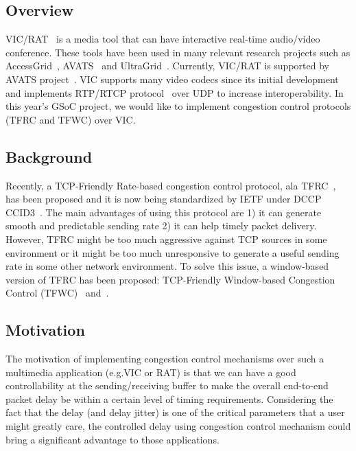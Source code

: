 
\subsection{\label{ssec:project_overview}Overview}

VIC/RAT~\cite{MEDIATOOLS} is a media tool that can have interactive real-time
audio/video conference. These tools have been used in many relevant research
projects such as AccessGrid~\cite{ACCESSGRID}, AVATS~\cite{AVATS} and
UltraGrid~\cite{UltraGrid}. Currently, VIC/RAT is supported by AVATS
project~\cite{AVATS}. VIC supports many video codecs since its initial
development and implements RTP/RTCP protocol~\cite{RTP} over UDP to increase
interoperability. In this year's GSoC project, we would like to implement
congestion control protocols (TFRC and TFWC) over VIC. 

\subsection{\label{ssec:background}Background}

Recently, a TCP-Friendly Rate-based congestion control protocol, ala
TFRC~\cite{FHPW00}, has been proposed and it is now being standardized by IETF
under DCCP CCID3~\cite{CCID3}. The main advantages of using this protocol are 1)
it can generate smooth and predictable sending rate 2) it can help timely packet
delivery. However, TFRC might be too much aggressive against TCP sources in some
environment or it might be too much unresponsive to generate a useful sending
rate in some other network environment. To solve this issue, a window-based
version of TFRC has been proposed: TCP-Friendly Window-based Congestion Control
(TFWC)~\cite{SH06} and~\cite{CH07}.

\subsection{\label{ssec:motivation}Motivation}

The motivation of implementing congestion control mechanisms over such a
multimedia application (e.g.VIC or RAT) is that we can have a good
controllability at the sending/receiving buffer to make the overall end-to-end
packet delay be within a certain level of timing requirements. Considering the
fact that the delay (and delay jitter) is one of the critical parameters that a
user might greatly care, the controlled delay using congestion control mechanism
could bring a significant advantage to those applications.

\newpage
